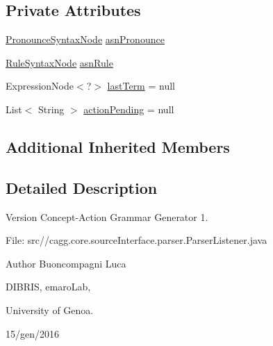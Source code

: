 \subsection*{Private Attributes}
\begin{DoxyCompactItemize}
\item 
\hyperlink{classit_1_1emarolab_1_1cagg_1_1core_1_1language_1_1syntax_1_1abstractTree_1_1syntaxNodeType_1_1PronounceSyntaxNode}{Pronounce\-Syntax\-Node} \hyperlink{classit_1_1emarolab_1_1cagg_1_1core_1_1language_1_1parser_1_1ParserListener_a1c88e6e14fbaa021d592996c713bd2d7}{asn\-Pronounce}
\item 
\hyperlink{classit_1_1emarolab_1_1cagg_1_1core_1_1language_1_1syntax_1_1abstractTree_1_1syntaxNodeType_1_1RuleSyntaxNode}{Rule\-Syntax\-Node} \hyperlink{classit_1_1emarolab_1_1cagg_1_1core_1_1language_1_1parser_1_1ParserListener_a7465766980394c7469e9f94e2c05bd0b}{asn\-Rule}
\item 
Expression\-Node$<$?$>$ \hyperlink{classit_1_1emarolab_1_1cagg_1_1core_1_1language_1_1parser_1_1ParserListener_ac7287bf5ff81d0cff238449b19bd891c}{last\-Term} = null
\item 
List$<$ String $>$ \hyperlink{classit_1_1emarolab_1_1cagg_1_1core_1_1language_1_1parser_1_1ParserListener_a01ae9f259d67cd1802123a15664fb21d}{action\-Pending} = null
\end{DoxyCompactItemize}
\subsection*{Additional Inherited Members}


\subsection{Detailed Description}
\begin{DoxyVersion}{Version}
Concept-\/\-Action Grammar Generator 1. \par
 File\-: src//cagg.core.\-source\-Interface.\-parser.\-Parser\-Listener.\-java \par

\end{DoxyVersion}
\begin{DoxyAuthor}{Author}
Buoncompagni Luca \par
 D\-I\-B\-R\-I\-S, emaro\-Lab,\par
 University of Genoa. \par
 15/gen/2016 \par

\end{DoxyAuthor}


